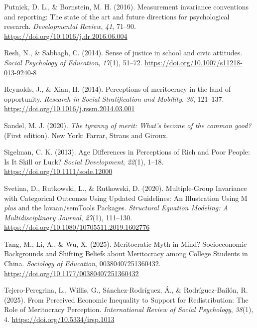 \documentclass[
  13pt,
]{article}
\newlength{\cslhangindent}
\newenvironment{CSLReferences}[2] %
 {\begin{list}{}{%
  \setlength{\itemindent}{0pt}
  \setlength{\leftmargin}{0pt}
  \setlength{\parsep}{0pt}
  \ifodd #1
   \setlength{\leftmargin}{\cslhangindent}
   \setlength{\itemindent}{-1\cslhangindent}
  \fi
  \setlength{\itemsep}{#2\baselineskip}}}
 {\end{list}}
\begin{document}
\begin{CSLReferences}{1}{0}
Putnick, D. L., \& Bornstein, M. H. (2016). Measurement invariance
conventions and reporting: {The} state of the art and future directions
for psychological research. \emph{Developmental Review}, \emph{41},
71--90. \url{https://doi.org/10.1016/j.dr.2016.06.004}

Resh, N., \& Sabbagh, C. (2014). Sense of justice in school and civic
attitudes. \emph{Social Psychology of Education}, \emph{17}(1), 51--72.
\url{https://doi.org/10.1007/s11218-013-9240-8}

Reynolds, J., \& Xian, H. (2014). Perceptions of meritocracy in the land
of opportunity. \emph{Research in Social Stratification and Mobility},
\emph{36}, 121--137. \url{https://doi.org/10.1016/j.rssm.2014.03.001}

Sandel, M. J. (2020). \emph{The tyranny of merit: {What}'s become of the
common good?} (First edition). New York: {Farrar, Straus and Giroux}.

Sigelman, C. K. (2013). Age {Differences} in {Perceptions} of {Rich} and
{Poor People}: {Is It Skill} or {Luck}? \emph{Social Development},
\emph{22}(1), 1--18. \url{https://doi.org/10.1111/sode.12000}

Svetina, D., Rutkowski, L., \& Rutkowski, D. (2020). Multiple-{Group
Invariance} with {Categorical Outcomes Using Updated Guidelines}: {An
Illustration Using M} {\emph{plus}} and the lavaan/{semTools Packages}.
\emph{Structural Equation Modeling: A Multidisciplinary Journal},
\emph{27}(1), 111--130.
\url{https://doi.org/10.1080/10705511.2019.1602776}

Tang, M., Li, A., \& Wu, X. (2025). Meritocratic {Myth} in {Mind}?
{Socioeconomic Backgrounds} and {Shifting Beliefs} about {Meritocracy}
among {College Students} in {China}. \emph{Sociology of Education},
00380407251360432. \url{https://doi.org/10.1177/00380407251360432}

Tejero-Peregrina, L., Willis, G., Sánchez-Rodríguez, Á., \&
Rodríguez-Bailón, R. (2025). From {Perceived Economic Inequality} to
{Support} for {Redistribution}: {The Role} of {Meritocracy Perception}.
\emph{International Review of Social Psychology}, \emph{38}(1), 4.
\url{https://doi.org/10.5334/irsp.1013}


\end{CSLReferences}
\end{document}
